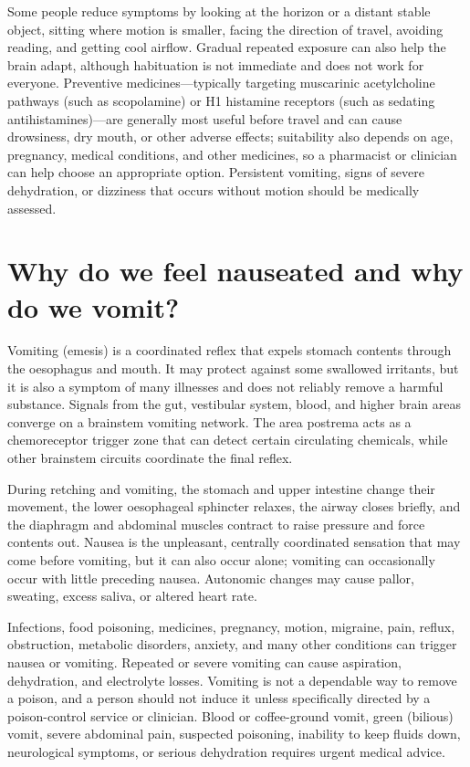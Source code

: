 \documentclass[11pt,oneside]{report}
\begin{document}
Some people reduce symptoms by looking at the horizon or a distant stable
object, sitting where motion is smaller, facing the direction of travel,
avoiding reading, and getting cool airflow. Gradual repeated exposure can also
help the brain adapt, although habituation is not immediate and does not work
for everyone. Preventive medicines—typically targeting muscarinic acetylcholine pathways (such
as scopolamine) or H1 histamine receptors (such as sedating antihistamines)—are
generally most useful before travel and can cause drowsiness, dry mouth, or
other adverse effects; suitability also depends on age, pregnancy, medical
conditions, and other medicines, so a pharmacist or clinician can help choose
an appropriate option. Persistent vomiting, signs of severe
dehydration, or dizziness that occurs without motion should be medically
assessed.

\section{Why do we feel nauseated and why do we vomit?}

Vomiting (emesis) is a coordinated reflex that expels stomach contents through
the oesophagus and mouth. It may protect against some swallowed irritants, but
it is also a symptom of many illnesses and does not reliably remove a harmful
substance. Signals from the gut, vestibular system, blood, and higher brain
areas converge on a brainstem vomiting network. The area postrema acts as a
chemoreceptor trigger zone that can detect certain circulating chemicals, while
other brainstem circuits coordinate the final reflex.

During retching and vomiting, the stomach and upper intestine change their
movement, the lower oesophageal sphincter relaxes, the airway closes briefly,
and the diaphragm and abdominal muscles contract to raise pressure and force
contents out. Nausea is the unpleasant, centrally coordinated sensation that may
come before vomiting, but it can also occur alone; vomiting can occasionally
occur with little preceding nausea. Autonomic changes may cause pallor,
sweating, excess saliva, or altered heart rate.

Infections, food poisoning, medicines, pregnancy, motion, migraine, pain,
reflux, obstruction, metabolic disorders, anxiety, and many other conditions
can trigger nausea or vomiting. Repeated or severe vomiting can cause
aspiration, dehydration, and electrolyte losses. Vomiting is not a dependable
way to remove a poison, and a person should not induce it unless specifically
directed by a poison-control service or clinician. Blood or coffee-ground vomit,
green (bilious) vomit, severe abdominal pain, suspected poisoning, inability
to keep fluids down, neurological symptoms, or serious dehydration requires
urgent medical advice.
\end{document}

